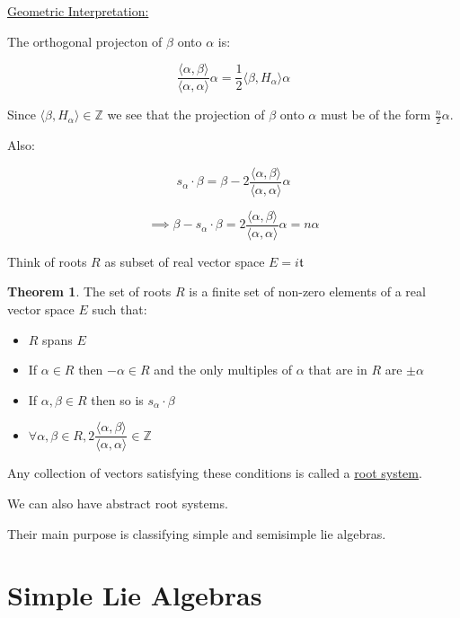 \documentclass{article}
\theoremstyle{definition}
\newtheorem{theorem}{Theorem}
\begin{document}
\underline{Geometric Interpretation:}

The orthogonal projecton of \(\beta \) onto \(\alpha \) is:

\[
    \frac{\langle \alpha ,\beta  \rangle }{\langle \alpha ,\alpha  \rangle }\alpha = \frac{1}{2} \langle \beta ,H_\alpha  \rangle \alpha
\]

Since \(\langle \beta ,H_\alpha \rangle \in \mathbb{Z}\) we see that the projection of \(\beta \) onto \(\alpha \) must be of the form \(\frac{n}{2}\alpha\).

Also:

\[
    s_\alpha \cdot \beta = \beta - 2 \frac{\langle \alpha ,\beta  \rangle }{\langle \alpha ,\alpha  \rangle } \alpha
\]

\[
    \implies \beta - s_\alpha \cdot \beta = 2\frac{\langle \alpha ,\beta  \rangle }{\langle \alpha ,\alpha  \rangle }\alpha = n \alpha
\] 

Think of roots \(R\) as subset of real vector space \(E = i \mathfrak{t} \)

\begin{theorem}
    The set of roots \(R\) is a finite set of non-zero elements of a real vector space \(E\) such that:

    \begin{itemize}
        \item \(R\) spans \(E\) 
        \item If \(\alpha \in R\) then \(-\alpha \in R\) and the only multiples of \(\alpha \) that are in \(R\) are \(\pm \alpha\) 
        \item If \(\alpha ,\beta \in R\) then so is \(s_\alpha \cdot \beta \) 
        \item \(\forall \alpha ,\beta \in R, 2\dfrac{\langle \alpha ,\beta  \rangle }{\langle \alpha ,\alpha  \rangle }\in \mathbb{Z}\) 
    \end{itemize}

\end{theorem}

Any collection of vectors satisfying these conditions is called a \underline{root system}.

We can also have abstract root systems.

Their main purpose is classifying simple and semisimple lie algebras.

\section*{Simple Lie Algebras}
\end{document}
